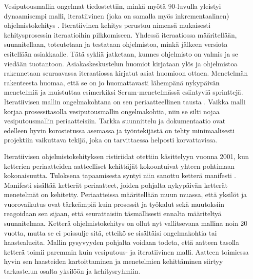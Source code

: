 Vesiputousmallin ongelmat tiedostettiin, minkä myötä 90-luvulla yleistyi dynaamisempi malli, iteratiivinen (joka on samalla myös inkrementaalinen) ohjelmistokehitys \cite{1204375}. Iteratiivinen kehitys perustuu nimensä mukaisesti kehitysprosessin iteraatioihin pilkkomiseen. Yhdessä iteraatiossa määritellään, suunnitellaan, toteutetaan ja testataan ohjelmistoa, minkä jälkeen versiota esitellään asiakkaalle. Tätä sykliä jatketaan, kunnes ohjelmisto on valmis ja se viedään tuotantoon. Asiakaskeskustelun huomiot kirjataan ylös ja ohjelmistoa rakennetaan seuraavassa iteraatiossa kirjatut asiat huomioon ottaen. Menetelmän rakenteesta huomaa, että se on jo huomattavasti lähempänä nykypäivän menetelmiä ja muistuttaa esimerkiksi Scrum-menetelmässä \cite{SCRUMORG} esiintyviä sprinttejä. Iteratiivisen mallin ongelmakohtana on sen periaatteellinen tausta \cite{1204375}. Vaikka malli korjaa prosessitasolla vesiputousmallin ongelmakohtia, niin se silti nojaa vesiputousmallin periaatteisiin. Tarkka suunnittelu ja dokumentaatio ovat edelleen hyvin korostetussa asemassa ja työntekijästä on tehty minimaalisesti projektiin vaikuttava tekijä, joka on tarvittaessa helposti korvattavissa.

Iteratiivisen ohjelmistokehityksen ristiriidat otettiin käsittelyyn vuonna 2001, kun ketterien periaatteiden aatteelliset kehittäjät kokoontuivat yhteen pohtimaan kokonaisuutta. Tuloksena tapaamisesta syntyi niin sanottu ketterä manifesti \cite{beck2001agile}. Manifesti sisältää ketterät periaatteet, joiden pohjalta nykypäivän ketterät menetelmät on kehitetty. Periaatteissa määritellään muun muassa, että yksilöt ja vuorovaikutus ovat tärkeämpiä kuin prosessit ja työkalut sekä muutoksiin reagoidaan sen sijaan, että seurattaisiin täsmällisesti ennalta määriteltyä suunnitelmaa. Ketterä ohjelmistokehitys on ollut nyt vallitsevana mallina noin 20 vuotta, mutta se ei poissulje sitä, etteikö se sisältäisi ongelmakohtia tai haastealueita. Mallin pysyvyyden pohjalta voidaan todeta, että aatteen tasolla ketterä toimii paremmin kuin vesiputous- ja iteratiivinen malli. Aatteen toimiessa hyvin sen haasteiden kartoittaminen ja menetelmien kehittäminen siirtyy tarkastelun osalta yksilöön ja kehitysryhmiin.

